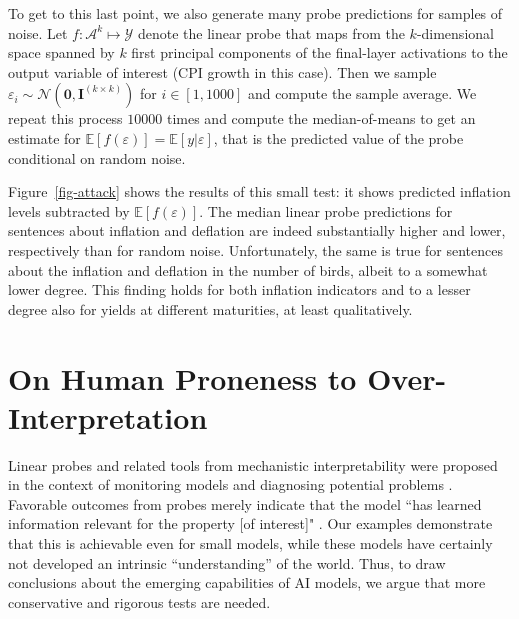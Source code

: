 \documentclass{article}
\theoremstyle{plain}
\theoremstyle{definition}
\theoremstyle{remark}
\begin{document}
To get to this last point, we also generate many probe predictions for samples of noise. Let \(f: \mathcal{A}^k \mapsto \mathcal{Y}\) denote the linear probe that maps from the \(k\)-dimensional space spanned by \(k\) first principal components of the final-layer activations to the output variable of interest (CPI growth in this case). Then we sample \(\varepsilon_i \sim \mathcal{N}(\mathbf{0},\mathbf{I}^{(k \times k)})\) for \(i \in [1,1000]\) and compute the sample average. We repeat this process \(10000\) times and compute the median-of-means to get an estimate for \(\mathbb{E}[f(\varepsilon)]=\mathbb{E}[y|\varepsilon]\), that is the predicted value of the probe conditional on random noise.

Figure~\ref{fig-attack} shows the results of this small test: it shows predicted inflation levels subtracted by \(\mathbb{E}[f(\varepsilon)]\). The median linear probe predictions for sentences about inflation and deflation are indeed substantially higher and lower, respectively than for random noise. Unfortunately, the same is true for sentences about the inflation and deflation in the number of birds, albeit to a somewhat lower degree. This finding holds for both inflation indicators and to a lesser degree also for yields at different maturities, at least qualitatively.

\section{On Human Proneness to Over-Interpretation}

Linear probes and related tools from mechanistic interpretability were proposed in the context of monitoring models and diagnosing potential problems \citep{alain2018understanding}. Favorable outcomes from probes merely indicate that the model ``has learned information relevant for the property [of interest]" \citep{belinkov2021probing}. Our examples demonstrate that this is achievable even for small models, while these models have certainly not developed an intrinsic ``understanding'' of the world. Thus, to draw conclusions about the emerging capabilities of AI models, we argue that more conservative and rigorous tests are needed.

\end{document}
